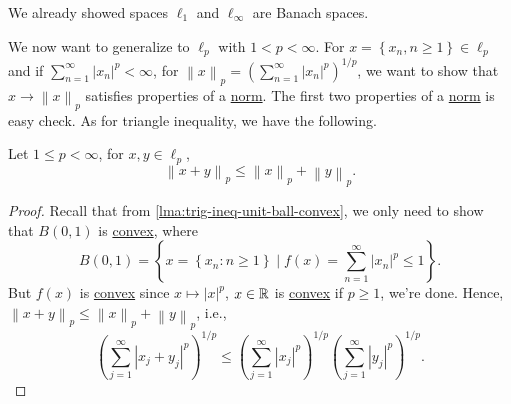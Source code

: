 \begin{eg}
	We already showed spaces \(\ell _1\) and \(\ell _{\infty }\) are Banach spaces.
\end{eg}

We now want to generalize to \(\ell _p\) with \(1 < p < \infty \). For \(x = \left\{ x_n, n\geq 1 \right\}\in \ell _p \) and if \(\sum_{n=1}^{\infty} \left\vert x_n \right\vert ^p < \infty \), for \(\left\lVert x\right\rVert _p = \left( \sum_{n=1}^{\infty} \left\vert x_n \right\vert ^p \right)^{1 / p}\), we want to show that \(x \to \left\lVert x\right\rVert _p\) satisfies properties of a \hyperref[def:norm]{norm}. The first two properties of a \hyperref[def:norm]{norm} is easy check. As for triangle inequality, we have the following.

\begin{lemma}\label{lma:Minkowski-ineq}
	Let \(1 \leq p < \infty \), for \(x, y\in \ell _p\),
	\[
		\left\lVert x + y\right\rVert _p \leq \left\lVert x\right\rVert _p + \left\lVert y\right\rVert _p.
	\]
\end{lemma}
\begin{proof}
	Recall that from \autoref{lma:trig-ineq-unit-ball-convex}, we only need to show that \(B(0, 1)\) is \hyperref[def:convex-function]{convex}, where
	\[
		B(0, 1) = \left\{ x = \left\{ x_n\colon n\geq 1 \right\}\mid f(x) = \sum_{n=1}^{\infty} \left\vert x_n \right\vert ^p\leq 1  \right\}.
	\]
	But \(f(x)\) is \hyperref[def:convex-function]{convex} since \(x\mapsto \left\vert x \right\vert ^p\), \(x\in \mathbb{\MakeUppercase{r}} \) is \hyperref[def:convex-set]{convex} if \(p\geq 1\), we're done. Hence, \(\left\lVert x+y\right\rVert _p \leq \left\lVert x\right\rVert _p + \left\lVert y\right\rVert _p\), i.e.,
	\[
		\left( \sum_{j=1}^{\infty} \left\vert x_j + y_j \right\vert ^p \right) ^{1 / p} \leq \left( \sum_{j=1}^{\infty} \left\vert x_{j}  \right\vert^p  \right) ^{1 / p} \left( \sum_{j=1}^{\infty} \left\vert y_{j}  \right\vert^p  \right)^{1 / p}.
	\]
\end{proof}

